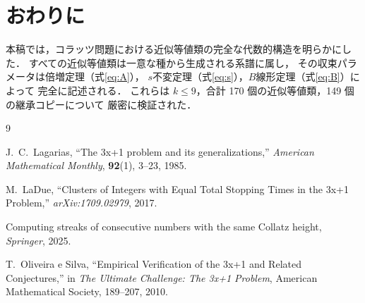 \documentclass[twocolumn,a4paper,10pt]{jsarticle}
\begin{document}
\section{おわりに}

本稿では，コラッツ問題における近似等値類の完全な代数的構造を明らかにした．
すべての近似等値類は一意な種から生成される系譜に属し，
その収束パラメータは倍増定理（式\eqref{eq:A}），
$s$不変定理（式\eqref{eq:s}），$B$線形定理（式\eqref{eq:B}）によって
完全に記述される．
これらは $k \leq 9$，合計 170 個の近似等値類，149 個の継承コピーについて
厳密に検証された．

\begin{thebibliography}{9}

J.~C.\ Lagarias,
``The 3x+1 problem and its generalizations,''
\textit{American Mathematical Monthly}, \textbf{92}(1), 3--23, 1985.

M.~LaDue,
``Clusters of Integers with Equal Total Stopping Times in the 3x+1 Problem,''
\textit{arXiv:1709.02979}, 2017.

Computing streaks of consecutive numbers with the same Collatz height,
\textit{Springer}, 2025.

T.~Oliveira e Silva,
``Empirical Verification of the 3x+1 and Related Conjectures,''
in \textit{The Ultimate Challenge: The 3x+1 Problem},
American Mathematical Society, 189--207, 2010.

\end{thebibliography}
\end{document}
